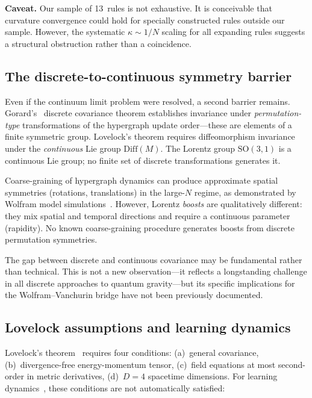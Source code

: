 \documentclass[11pt]{article}
\theoremstyle{definition}
\theoremstyle{remark}
\begin{document}
\textbf{Caveat.}
Our sample of 13~rules is not exhaustive.
It is conceivable that curvature convergence could hold for specially
constructed rules outside our sample.
However, the systematic $\kappa \sim 1/N$ scaling for all expanding
rules suggests a structural obstruction rather than a coincidence.

\subsection{The discrete-to-continuous symmetry barrier}
\label{sec:symmetry-barrier}

Even if the continuum limit problem were resolved, a second barrier
remains.
Gorard's~\cite{Gorard2020} discrete covariance theorem establishes
invariance under \emph{permutation-type} transformations of the
hypergraph update order---these are elements of a finite symmetric group.
Lovelock's theorem requires diffeomorphism invariance under the
\emph{continuous} Lie group $\mathrm{Diff}(M)$.
The Lorentz group $\mathrm{SO}(3,1)$ is a continuous Lie group; no finite
set of discrete transformations generates it.

Coarse-graining of hypergraph dynamics can produce approximate spatial
symmetries (rotations, translations) in the large-$N$ regime, as
demonstrated by Wolfram model simulations~\cite{Wolfram2020}.
However, Lorentz \emph{boosts} are qualitatively different: they mix
spatial and temporal directions and require a continuous parameter
(rapidity).
No known coarse-graining procedure generates boosts from discrete
permutation symmetries.

The gap between discrete and continuous covariance may be fundamental
rather than technical.
This is not a new observation---it reflects a longstanding challenge in
all discrete approaches to quantum gravity---but its specific implications
for the Wolfram--Vanchurin bridge have not been previously documented.

\subsection{Lovelock assumptions and learning dynamics}
\label{sec:lovelock-learning}

Lovelock's theorem~\cite{Lovelock1971} requires four conditions:
(a)~general covariance, (b)~divergence-free energy-momentum tensor,
(c)~field equations at most second-order in metric derivatives,
(d)~$D = 4$ spacetime dimensions.
For learning dynamics~\cite{Vanchurin2020,Vanchurin2025}, these conditions
are not automatically satisfied:
\end{document}
